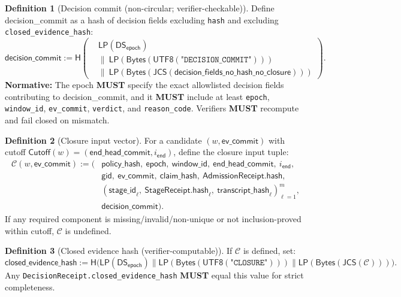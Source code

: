 \documentclass[11pt]{article}
\newcommand{\MUST}{\textbf{MUST}}
\newcommand{\code}[1]{\texttt{#1}}
\newcommand{\1}{\mathbf{1}}
\newcommand{\Hash}{\mathsf{H}}
\newcommand{\DS}{\mathsf{DS}}
\newcommand{\LP}{\mathsf{LP}}
\theoremstyle{definition}
\newtheorem{definition}{Definition}
\theoremstyle{plain}
\begin{document}
\begin{definition}[Decision commit (non-circular; verifier-checkable)]
\label{def:decision_commit}
Define \textsf{decision\_commit} as a hash of decision fields excluding \code{hash} and excluding \code{closed\_evidence\_hash}:
\[
\textsf{decision\_commit}:=\Hash\!\left(\begin{aligned}
  &\LP(\DS_{\textsf{epoch}})\\
  &\|\ \LP(\mathsf{Bytes}(\textsf{UTF8}(\texttt{"DECISION\_COMMIT"})))\\
  &\|\ \LP(\mathsf{Bytes}(\textsf{JCS}(\textsf{decision\_fields\_no\_hash\_no\_closure})))
\end{aligned}\right).
\]
\textbf{Normative:} The epoch \MUST{} specify the exact allowlisted decision fields contributing to \textsf{decision\_commit}, and it \MUST{} include at least \code{epoch}, \code{window\_id}, \code{ev\_commit}, \code{verdict}, and \code{reason\_code}. Verifiers \MUST{} recompute and fail closed on mismatch.
\end{definition}

\begin{definition}[Closure input vector]
\label{def:closure_inputs}
For a candidate $(w,\textsf{ev\_commit})$ with cutoff $\textsf{Cutoff}(w)=(\textsf{end\_head\_commit}, i_{\textsf{end}})$, define the closure input tuple:
\begin{align*}
\mathcal{C}(w,\textsf{ev\_commit}) := (&\textsf{policy\_hash},\ \textsf{epoch},\ \textsf{window\_id},\ \textsf{end\_head\_commit},\ i_{\textsf{end}},\\
&\textsf{gid},\ \textsf{ev\_commit},\ \textsf{claim\_hash},\ \textsf{AdmissionReceipt.hash},\\
&(\textsf{stage\_id}_\ell,\ \textsf{StageReceipt.hash}_\ell,\ \textsf{transcript\_hash}_\ell)_{\ell=1}^m,\\
&\textsf{decision\_commit}).
\end{align*}
If any required component is missing/invalid/non-unique or not inclusion-proved within cutoff, $\mathcal{C}$ is undefined.
\end{definition}

\begin{definition}[Closed evidence hash (verifier-computable)]
\label{def:closed_hash}
If $\mathcal{C}$ is defined, set:
\[
\textsf{closed\_evidence\_hash}:=\Hash\big(
\LP(\DS_{\textsf{epoch}})\|\LP(\mathsf{Bytes}(\textsf{UTF8}(\texttt{"CLOSURE"})))\|\LP(\mathsf{Bytes}(\textsf{JCS}(\mathcal{C})))
\big).
\]
Any \code{DecisionReceipt.closed\_evidence\_hash} \MUST{} equal this value for strict completeness.
\end{definition}
\end{document}
